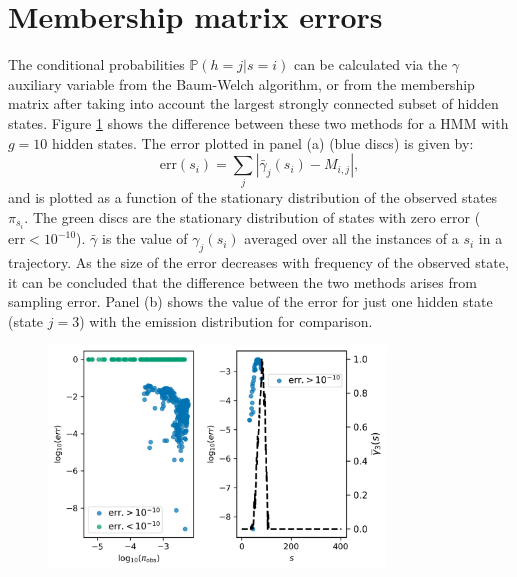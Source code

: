 \section{Membership matrix errors}\label{sec:app_membership_errors}

The conditional probabilities $\mathbb{P}(h=j|s=i)$ can be calculated via the $\gamma$ auxiliary variable from the Baum-Welch algorithm\cite{baumMaximizationTechniqueOccurring1970, welch2003hidden}, or from the membership matrix after taking into account the largest strongly connected subset of hidden states.  Figure \ref{fig:membership_error} shows the difference between these two methods for a HMM with $g=10$ hidden states.  The error plotted in panel (a) (blue discs) is given by:
\begin{equation}\label{eqn:err_entropy}
\mathrm{err}(s_{i}) = \sum_j|\bar{\gamma}_{j}(s_{i}) - M_{i, j}|, 
\end{equation}
and is plotted as a function of the stationary distribution of the observed states $\pi_{s_{i}}$. The green discs are the stationary distribution of states with zero error ($\mathrm{err}<10^{-10}$). $\bar{\gamma}$ is the value of $\gamma_{j}(s_{i})$ averaged over all the instances of a $s_{i}$ in a trajectory. As the size of the error decreases with frequency of the observed state, it can be concluded that the difference between the two methods arises from sampling error. Panel (b) shows the value of the error for just one hidden state (state $j=3$) with the emission distribution for comparison. 
\begin{figure}
    \centering
    \includegraphics[width=0.8\textwidth]{chapters/hmm_selection/figures/entropy_error_explanation.png}
    \label{fig:membership_error}
\end{figure}

